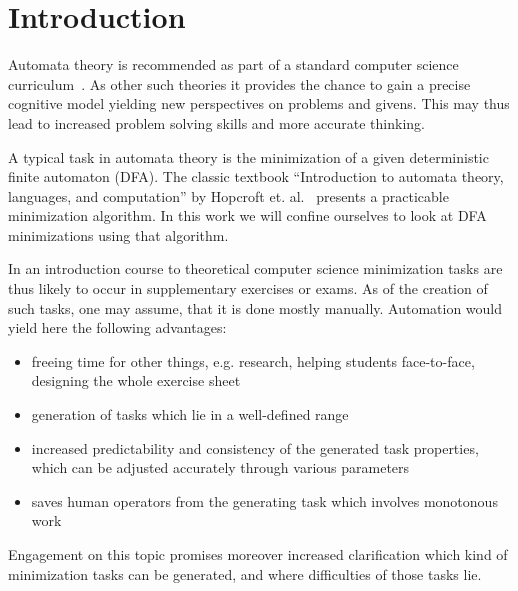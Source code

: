 
\chapter{Introduction}


Automata theory is recommended as part of a standard computer science curriculum~\cite[pp. 5-6]{GI16}. As other such theories it provides the chance to gain a precise cognitive model yielding new perspectives on problems and givens. This may thus lead to increased problem solving skills and more accurate thinking.


A typical task in automata theory is the minimization of a given deterministic finite automaton (DFA). The classic textbook ``Introduction to automata theory, languages, and computation'' by Hopcroft et. al.~\cite{HMU01} presents a practicable minimization algorithm. In this work we will confine ourselves to look at DFA minimizations using that algorithm.


In an introduction course to theoretical computer science minimization tasks are thus likely to occur in supplementary exercises or exams. As of the creation of such tasks, one may assume, that it is done mostly manually. Automation would yield here the following advantages:

\begin{itemize}
	\item freeing time for other things, e.g. research, helping students face-to-face, designing the whole exercise sheet
	
	\item generation of tasks which lie in a well-defined range
	
	\item increased predictability and consistency of the generated task properties, which can be adjusted accurately through various parameters
	
	\item saves human operators from the generating task which involves monotonous work
\end{itemize}
Engagement on this topic promises moreover increased clarification which kind of minimization tasks can be generated, and where difficulties of those tasks lie.

